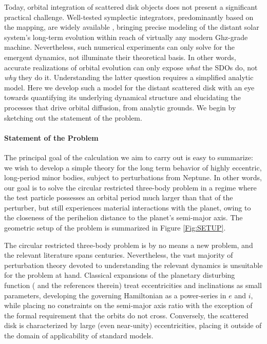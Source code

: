 \documentclass[twocolumn]{aastex62}
\begin{document}
Today, orbital integration of scattered disk objects does not present a significant practical challenge. Well-tested symplectic integrators, predominantly based on the \citet{1991AJ....102.1528W} mapping, are widely available \citep{1998AJ....116.2067D, 1999MNRAS.304..793C, 2019MNRAS.485.5490R, 2019MNRAS.489.4632R}, bringing precise modeling of the distant solar system's long-term evolution within reach of virtually any modern Ghz-grade machine. Nevertheless, such numerical experiments can only solve for the emergent dynamics, not illuminate their theoretical basis. In other words, accurate realizations of orbital evolution can only expose \textit{what} the SDOs do, not \textit{why} they do it. Understanding the latter question requires a simplified analytic model. Here we develop such a model for the distant scattered disk with an eye towards quantifying its underlying dynamical structure and elucidating the processes that drive orbital diffusion, from analytic grounds. We begin by sketching out the statement of the problem. 

\paragraph{Statement of the Problem} The principal goal of the calculation we aim to carry out is easy to summarize: we wish to develop a simple theory for the long term behavior of highly eccentric, long-period minor bodies, subject to perturbations from Neptune. In other words, our goal is to solve the circular restricted three-body problem in a regime where the test particle possesses an orbital period much larger than that of the perturber, but still experiences material interactions with the planet, owing to the closeness of the perihelion distance to the planet's semi-major axis. The geometric setup of the problem is summarized in Figure \ref{Fig:SETUP}.

The circular restricted three-body problem is by no means a new problem, and the relevant literature spans centuries. Nevertheless, the vast majority of perturbation theory devoted to understanding the relevant dynamics is unsuitable for the problem at hand. Classical expansions of the planetary disturbing function (\citealt{1995CeMDA..62..193L, 2000Icar..147..129E} and the references therein) treat eccentricities and inclinations as small parameters, developing the governing Hamiltonian as a power-series in $e$ and $i$, while placing no constraints on the semi-major axis ratio with the exception of the formal requirement that the orbits do not cross. Conversely, the scattered disk is characterized by large (even near-unity) eccentricities, placing it outside of the domain of applicability of standard models.
\end{document}
